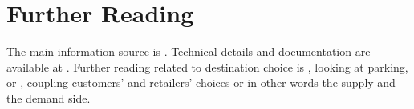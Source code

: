 \section{Further Reading}
The main information source is \citet[][]{Horni_PhDThesis_2013}. Technical details and documentation are available at \citet[][]{MATSIM-T-DC_Webpage_2014}. Further reading related to destination choice is \citet[][]{HorniEtAl_IATBRspec_2013}, looking at parking, or \citet[][]{HorniEtAl_TechRep_IVT_2012}, coupling customers' and retailers' choices or in other words the supply and the demand side.

